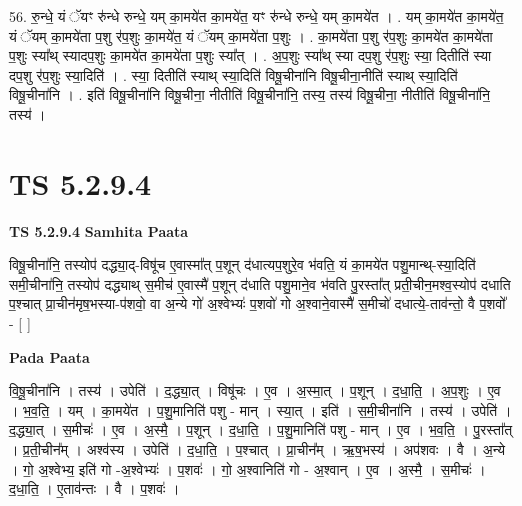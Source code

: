 \documentclass[17pt]{extarticle}
\begin{document}
56. रु॒न्धे॒ यं ॅयꣳ रु॑न्धे रुन्धे॒ यम् का॒मये॑त का॒मये॑त॒ यꣳ रु॑न्धे रुन्धे॒ यम् का॒मये॑त । . यम् का॒मये॑त का॒मये॑त॒ यं ॅयम् का॒मये॑ता प॒शु र॑प॒शुः का॒मये॑त॒ यं ॅयम् का॒मये॑ता प॒शुः । . का॒मये॑ता प॒शु र॑प॒शुः का॒मये॑त का॒मये॑ता प॒शुः स्या᳚थ् स्यादप॒शुः का॒मये॑त का॒मये॑ता प॒शुः स्या᳚त् । . अ॒प॒शुः स्या᳚थ् स्या दप॒शु र॑प॒शुः स्या॒ दितीति॑ स्या दप॒शु र॑प॒शुः स्या॒दिति॑ । . स्या॒ दितीति॑ स्याथ् स्या॒दिति॑ विषू॒चीना॑नि विषू॒चीना॒नीति॑ स्याथ् स्या॒दिति॑ विषू॒चीना॑नि । . इति॑ विषू॒चीना॑नि विषू॒चीना॒ नीतीति॑ विषू॒चीना॑नि॒ तस्य॒ तस्य॑ विषू॒चीना॒ नीतीति॑ विषू॒चीना॑नि॒ तस्य॑ । \newline
\pagebreak
{}

\section{ TS 5.2.9.4 }

\textbf{TS 5.2.9.4 } \newline
\textbf{Samhita Paata} \newline

विषू॒चीना॑नि॒ तस्योप॑ दद्ध्या॒द्-विषू॑च ए॒वास्मा᳚त् प॒शून् द॑धात्यप॒शुरे॒व भ॑वति॒ यं का॒मये॑त पशु॒मान्थ्-स्या॒दिति॑ समी॒चीना॑नि॒ तस्योप॑ दद्ध्याथ् स॒मीच॑ ए॒वास्मै॑ प॒शून् द॑धाति पशु॒माने॒व भ॑वति पु॒रस्ता᳚त् प्रती॒चीन॒मश्व॒स्योप॑ दधाति प॒श्चात् प्रा॒चीन॑मृष॒भस्या-प॑शवो॒ वा अ॒न्ये गो॑ अ॒श्वेभ्यः॑ प॒शवो॑ गो अ॒श्वाने॒वास्मै॑ स॒मीचो॑ दधात्ये॒-ताव॑न्तो॒ वै प॒शवो᳚ - [  ] \newline

\textbf{Pada Paata} \newline

वि॒षू॒चीना॑नि । तस्य॑ । उपेति॑ । द॒द्ध्या॒त् । विषू॑चः । ए॒व । अ॒स्मा॒त् । प॒शून् । द॒धा॒ति॒ । अ॒प॒शुः । ए॒व । भ॒व॒ति॒ । यम् । का॒मये॑त । प॒शु॒मानिति॑ पशु - मान् । स्या॒त् । इति॑ । स॒मी॒चीना॑नि । तस्य॑ । उपेति॑ । द॒द्ध्या॒त् । स॒मीचः॑ । ए॒व । अ॒स्मै॒ । प॒शून् । द॒धा॒ति॒ । प॒शु॒मानिति॑ पशु - मान् । ए॒व । भ॒व॒ति॒ । पु॒रस्ता᳚त् । प्र॒ती॒चीन᳚म् । अश्व॑स्य । उपेति॑ । द॒धा॒ति॒ । प॒श्चात् । प्रा॒चीन᳚म् । ऋ॒ष॒भस्य॑ । अप॑शवः । वै । अ॒न्ये । गो॒ अ॒श्वेभ्य॒ इति॑ गो -अ॒श्वेभ्यः॑ । प॒शवः॑ । गो॒ अ॒श्वानिति॑ गो - अ॒श्वान् । ए॒व । अ॒स्मै॒ । स॒मीचः॑ । द॒धा॒ति॒ । ए॒ताव॑न्तः । वै । प॒शवः॑ ।  \newline
\end{document}
